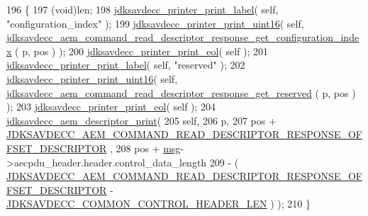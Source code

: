 \begin{DoxyCode}
196 \{
197     (void)len;
198     \hyperlink{group__util_gaf7818b24143b3c7502926a425a242ff5}{jdksavdecc\_printer\_print\_label}( \textcolor{keyword}{self}, \textcolor{stringliteral}{"configuration\_index"} );
199     \hyperlink{group__util_ga9793e0ff8e7ed25d957282ee6b257ce2}{jdksavdecc\_printer\_print\_uint16}( \textcolor{keyword}{self}, 
      \hyperlink{group__command__read__descriptor__response_ga0d1826279430f6203f212b1851732796}{jdksavdecc\_aem\_command\_read\_descriptor\_response\_get\_configuration\_index}
      ( p, pos ) );
200     \hyperlink{group__util_gacda56c9d3d24593a52c999682fa6e6e3}{jdksavdecc\_printer\_print\_eol}( \textcolor{keyword}{self} );
201     \hyperlink{group__util_gaf7818b24143b3c7502926a425a242ff5}{jdksavdecc\_printer\_print\_label}( \textcolor{keyword}{self}, \textcolor{stringliteral}{"reserved"} );
202     \hyperlink{group__util_ga9793e0ff8e7ed25d957282ee6b257ce2}{jdksavdecc\_printer\_print\_uint16}( \textcolor{keyword}{self}, 
      \hyperlink{group__command__read__descriptor__response_ga53774a513591f6a9fa2ecbfee4686c45}{jdksavdecc\_aem\_command\_read\_descriptor\_response\_get\_reserved}
      ( p, pos ) );
203     \hyperlink{group__util_gacda56c9d3d24593a52c999682fa6e6e3}{jdksavdecc\_printer\_print\_eol}( \textcolor{keyword}{self} );
204     \hyperlink{group__aem__print_gadd626df0712b38901c31f452c182ee82}{jdksavdecc\_aem\_descriptor\_print}(
205         \textcolor{keyword}{self},
206         p,
207         pos + \hyperlink{group__command__read__descriptor__response_gafbdbe4e6fbe486f0e98450bd1bcecafc}{JDKSAVDECC\_AEM\_COMMAND\_READ\_DESCRIPTOR\_RESPONSE\_OFFSET\_DESCRIPTOR}
      ,
208         pos + \hyperlink{maap__log__linux_8c_a0c7e58a50354c4a4d6dad428d0e47029}{msg}->aecpdu\_header.header.control\_data\_length
209         - ( \hyperlink{group__command__read__descriptor__response_gafbdbe4e6fbe486f0e98450bd1bcecafc}{JDKSAVDECC\_AEM\_COMMAND\_READ\_DESCRIPTOR\_RESPONSE\_OFFSET\_DESCRIPTOR}
       - \hyperlink{group__jdksavdecc__avtp__common__control__header_gaae84052886fb1bb42f3bc5f85b741dff}{JDKSAVDECC\_COMMON\_CONTROL\_HEADER\_LEN} ) );
210 \}
\end{DoxyCode}


